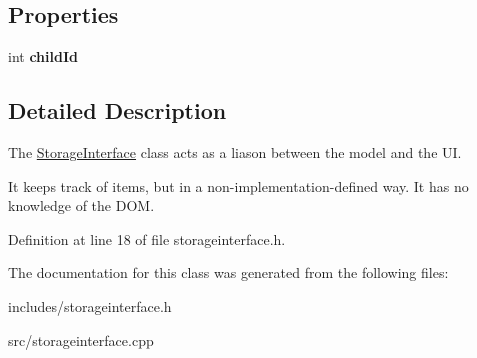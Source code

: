 \subsection*{Properties}
\begin{DoxyCompactItemize}
\item 
\mbox{\label{classStorageInterface_ac0a37a874f47facde620b2382ee4c32d}} 
int {\bfseries child\+Id}
\end{DoxyCompactItemize}


\subsection{Detailed Description}
The \hyperlink{classStorageInterface}{Storage\+Interface} class acts as a liason between the model and the UI. 

It keeps track of items, but in a non-\/implementation-\/defined way. It has no knowledge of the D\+OM. 

Definition at line 18 of file storageinterface.\+h.



The documentation for this class was generated from the following files\+:\begin{DoxyCompactItemize}
\item 
includes/storageinterface.\+h\item 
src/storageinterface.\+cpp\end{DoxyCompactItemize}
